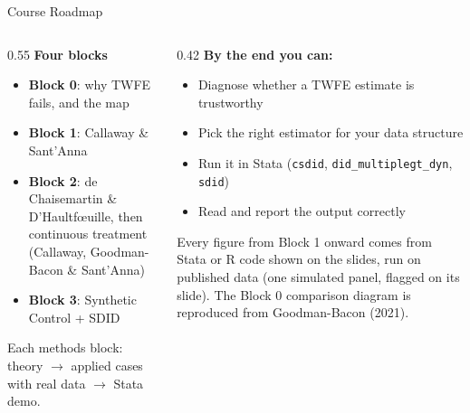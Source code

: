 \documentclass[main.tex]{subfiles}
\begin{document}
\begin{frame}{Course Roadmap}

  \begin{columns}[T]
    \begin{column}{0.55\textwidth}
      \textbf{Four blocks}
      \begin{itemize}
        \item[\color{AlertRed}$\blacktriangleright$] \textbf{Block 0}: why TWFE
          fails, and the map
        \item[\color{MidBlue}$\blacktriangleright$] \textbf{Block 1}: Callaway \&
          Sant'Anna
        \item[\color{MidBlue}$\blacktriangleright$] \textbf{Block 2}:
          de Chaisemartin \& D'Haultf\oe{}uille, then continuous
          treatment (Callaway, Goodman-Bacon \& Sant'Anna)
        \item[\color{MidBlue}$\blacktriangleright$] \textbf{Block 3}: Synthetic
          Control + SDID
      \end{itemize}

      \medskip
      \footnotesize Each methods block: theory $\to$ applied cases with real data
      $\to$ Stata demo.
    \end{column}
    \begin{column}{0.42\textwidth}
      \textbf{By the end you can:}
      \begin{itemize}
        \item Diagnose whether a TWFE estimate is trustworthy
        \item Pick the right estimator for your data structure
        \item Run it in Stata (\texttt{csdid}, \texttt{did\_multiplegt\_dyn},
          \texttt{sdid})
        \item Read and report the output correctly
      \end{itemize}

      \medskip
      \footnotesize Every figure from Block 1 onward comes from Stata or R code
      shown on the slides, run on published data (one simulated panel, flagged
      on its slide). The Block 0 comparison diagram is reproduced from
      Goodman-Bacon (2021).
    \end{column}
  \end{columns}

\end{frame}
\end{document}
